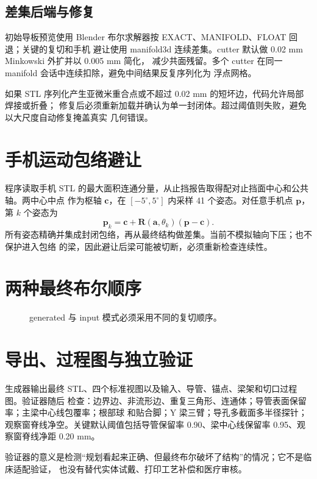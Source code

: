 \subsection{差集后端与修复}

初始导板预览使用 Blender 布尔求解器按 EXACT、MANIFOLD、FLOAT 回退；关键的复切和手机
避让使用 manifold3d 连续差集。cutter 默认做 0.02 mm Minkowski 外扩并以 0.005 mm 简化，
减少共面残留。多个 cutter 在同一 manifold 会话中连续扣除，避免中间结果反复序列化为
浮点网格。

如果 STL 序列化产生亚微米重合点或不超过 0.02 mm 的短坏边，代码允许局部焊接或折叠；
修复后必须重新加载并确认为单一封闭体。超过阈值则失败，避免以大尺度自动修复掩盖真实
几何错误。

\section{手机运动包络避让}

程序读取手机 STL 的最大面积连通分量，从止挡报告取得配对止挡面中心和公共轴。两中心中点
作为枢轴 $\mathbf c$，在 $[-5^\circ,5^\circ]$ 内采样 41 个姿态。对任意手机点
$\mathbf p$，第 $k$ 个姿态为
\[
  \mathbf p_k=\mathbf c+\mathbf R(\mathbf a,\theta_k)(\mathbf p-\mathbf c).
\]
所有姿态精确并集成封闭包络，再从最终结构做差集。当前不模拟轴向下压；也不保护进入包络
的梁，因此避让后梁可能被切断，必须重新检查连续性。

\section{两种最终布尔顺序}

\begin{figure}[H]
\centering
{}
\caption{generated 与 input 模式必须采用不同的复切顺序。}
\label{fig:boolean-order}
\end{figure}

\section{导出、过程图与独立验证}

生成器输出最终 STL、四个标准视图以及输入、导管、锚点、梁架和切口过程图。验证器随后
检查：边界边、非流形边、重复三角形、连通体；导管表面保留率；主梁中心线包覆率；根部球
和贴合脚；Y 梁三臂；导孔多截面多半径探针；观察窗脊线净空。关键默认阈值包括导管保留率
0.90、梁中心线保留率 0.95、观察窗脊线净距 0.20 mm。

验证器的意义是检测“规划看起来正确、但最终布尔破坏了结构”的情况；它不是临床适配验证，
也没有替代实体试戴、打印工艺补偿和医疗审核。

